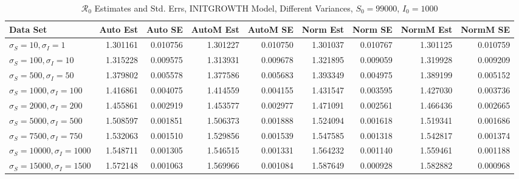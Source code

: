 \documentclass[12pt]{article}
\newcommand{\rr}{\ensuremath{\mathcal{R}_0}}
\begin{document}
\begin{table}[H]
	
	\caption{$\rr$ Estimates and Std. Errs, INITGROWTH Model, 
		Different Variances, $S_0 = 99000$, $I_0 = 1000$}
	\begin{footnotesize}
		\hskip -1.7cm
	\begin{tabular}{l|r|r|r|r|r|r|r|r}
		\hline
		Data Set & Auto Est & Auto SE & AutoM Est & AutoM SE & Norm Est & Norm SE & NormM Est & NormM SE\\
		\hline
		$\sigma_S = 10, \sigma_I = 1$ & 1.301161 & 0.010756 & 1.301227 & 0.010750 & 1.301037 & 0.010767 & 1.301125 & 0.010759\\
		\hline
		$\sigma_S = 100, \sigma_I = 10$ & 1.315228 & 0.009575 & 1.313931 & 0.009678 & 1.321895 & 0.009059 & 1.319928 & 0.009209\\
		\hline
		$\sigma_S = 500, \sigma_I = 50$ & 1.379802 & 0.005578 & 1.377586 & 0.005683 & 1.393349 & 0.004975 & 1.389199 & 0.005152\\
		\hline
		$\sigma_S = 1000, \sigma_I = 100$ & 1.416861 & 0.004075 & 1.414559 & 0.004155 & 1.431547 & 0.003595 & 1.427030 & 0.003736\\
		\hline
		$\sigma_S = 2000, \sigma_I = 200$ & 1.455861 & 0.002919 & 1.453577 & 0.002977 & 1.471091 & 0.002561 & 1.466436 & 0.002665\\
		\hline
		$\sigma_S = 5000, \sigma_I = 500$ & 1.508597 & 0.001851 & 1.506373 & 0.001888 & 1.524094 & 0.001618 & 1.519341 & 0.001686\\
		\hline
		$\sigma_S = 7500, \sigma_I = 750$ & 1.532063 & 0.001510 & 1.529856 & 0.001539 & 1.547585 & 0.001318 & 1.542817 & 0.001374\\
		\hline
		$\sigma_S = 10000, \sigma_I = 1000$ & 1.548711 & 0.001305 & 1.546515 & 0.001331 & 1.564232 & 0.001140 & 1.559461 & 0.001188\\
		\hline
		$\sigma_S = 15000, \sigma_I = 1500$ & 1.572148 & 0.001063 & 1.569966 & 0.001084 & 1.587649 & 0.000928 & 1.582882 & 0.000968\\
		\hline
	\end{tabular}
\end{footnotesize}
\end{table}
\end{document}
